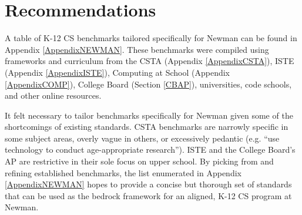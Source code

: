 
\chapter{Recommendations} %

\label{Chapter4} %


A table of K-12 CS benchmarks tailored specifically for Newman can be found in Appendix \ref{AppendixNEWMAN}. These benchmarks were compiled using frameworks and curriculum from the CSTA (Appendix \ref{AppendixCSTA}), ISTE (Appendix \ref{AppendixISTE}), Computing at School (Appendix \ref{AppendixCOMP}), College Board (Section \ref{CBAP}), universities, code schools, and other online resources. \par
It felt necessary to tailor benchmarks specifically for Newman given some of the shortcomings of existing standards. CSTA benchmarks are narrowly specific in some subject areas, overly vague in others, or excessively pedantic (e.g. ``use technology to conduct age-appropriate research''). ISTE and the College Board's AP are restrictive in their sole focus on upper school. By picking from and refining established benchmarks, the list enumerated in Appendix \ref{AppendixNEWMAN} hopes to provide a concise but thorough set of standards that can be used as the bedrock framework for an aligned, K-12 CS program at Newman.
